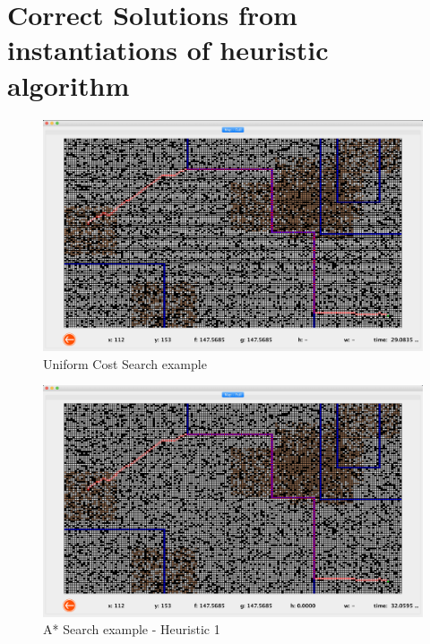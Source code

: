 \section{Correct Solutions from instantiations of heuristic algorithm}

\begin{figure}[H]
	\centering
 	\includegraphics[scale = 0.25]{ucs_grid.png}
	\caption{Uniform Cost Search example}
	\label{fig: Uniform Cost Search Path Trace}
\end{figure}

\begin{figure}[H]
	\centering
  \includegraphics[scale = 0.25]{astar_grid.png}
	\caption{A* Search example - Heuristic 1}
	\label{fig: A* Search Path Trace H2}
\end{figure}

